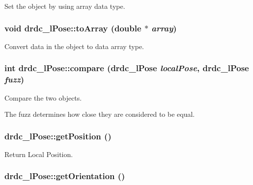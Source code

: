 Set the object by using array data type. 

\hypertarget{classdrdc__lPose_2279cd2f27850888c3fdfea0ca14e4d4}{
\subsubsection[toArray]{\setlength{\rightskip}{0pt plus 5cm}void drdc\_\-lPose::toArray (double $\ast$ {\em array})}}
\label{classdrdc__lPose_2279cd2f27850888c3fdfea0ca14e4d4}


Convert data in the object to data array type. 

\hypertarget{classdrdc__lPose_0b31eb0f050398db82c6d942fc190cfd}{
\subsubsection[compare]{\setlength{\rightskip}{0pt plus 5cm}int drdc\_\-lPose::compare ({\bf drdc\_\-lPose} {\em localPose}, \/  {\bf drdc\_\-lPose} {\em fuzz})}}
\label{classdrdc__lPose_0b31eb0f050398db82c6d942fc190cfd}


Compare the two objects. 

The fuzz determines how close they are considered to be equal. \hypertarget{classdrdc__lPose_9ca79a1aa842f3187d25d783ada66f2a}{
\subsubsection[getPosition]{ drdc\_\-lPose::getPosition ()}}
\label{classdrdc__lPose_9ca79a1aa842f3187d25d783ada66f2a}


Return Local Position. 

\hypertarget{classdrdc__lPose_0f3c4aacd51b0f1f41de86bd90baaa7d}{
\subsubsection[getOrientation]{ drdc\_\-lPose::getOrientation ()}}
\label{classdrdc__lPose_0f3c4aacd51b0f1f41de86bd90baaa7d}


